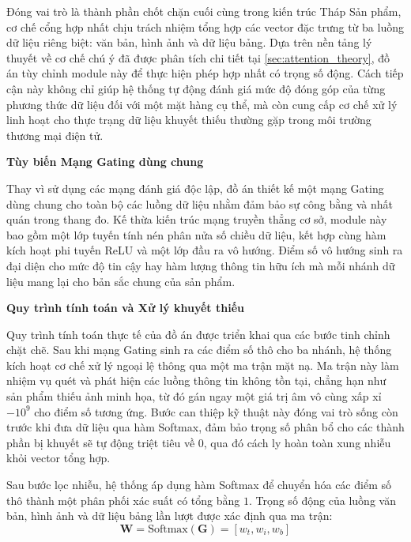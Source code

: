 Đóng vai trò là thành phần chốt chặn cuối cùng trong kiến trúc Tháp Sản phẩm, cơ chế cổng hợp nhất chịu trách nhiệm tổng hợp các vector đặc trưng từ ba luồng dữ liệu riêng biệt: văn bản, hình ảnh và dữ liệu bảng. Dựa trên nền tảng lý thuyết về cơ chế chú ý đã được phân tích chi tiết tại \ref{sec:attention_theory}, đồ án tùy chỉnh module này để thực hiện phép hợp nhất có trọng số động. Cách tiếp cận này không chỉ giúp hệ thống tự động đánh giá mức độ đóng góp của từng phương thức dữ liệu đối với một mặt hàng cụ thể, mà còn cung cấp cơ chế xử lý linh hoạt cho thực trạng dữ liệu khuyết thiếu thường gặp trong môi trường thương mại điện tử.

\vspace{0.3cm}
\noindent \textbf{Tùy biến Mạng Gating dùng chung}

Thay vì sử dụng các mạng đánh giá độc lập, đồ án thiết kế một mạng Gating dùng chung cho toàn bộ các luồng dữ liệu nhằm đảm bảo sự công bằng và nhất quán trong thang đo. Kế thừa kiến trúc mạng truyền thẳng cơ sở, module này bao gồm một lớp tuyến tính nén phân nửa số chiều dữ liệu, kết hợp cùng hàm kích hoạt phi tuyến ReLU và một lớp đầu ra vô hướng. Điểm số vô hướng sinh ra đại diện cho mức độ tin cậy hay hàm lượng thông tin hữu ích mà mỗi nhánh dữ liệu mang lại cho bản sắc chung của sản phẩm.

\vspace{0.3cm}
\noindent \textbf{Quy trình tính toán và Xử lý khuyết thiếu}

Quy trình tính toán thực tế của đồ án được triển khai qua các bước tinh chỉnh chặt chẽ. Sau khi mạng Gating sinh ra các điểm số thô cho ba nhánh, hệ thống kích hoạt cơ chế xử lý ngoại lệ thông qua một ma trận mặt nạ. Ma trận này làm nhiệm vụ quét và phát hiện các luồng thông tin không tồn tại, chẳng hạn như sản phẩm thiếu ảnh minh họa, từ đó gán ngay một giá trị âm vô cùng xấp xỉ $-10^9$ cho điểm số tương ứng. Bước can thiệp kỹ thuật này đóng vai trò sống còn trước khi đưa dữ liệu qua hàm Softmax, đảm bảo trọng số phân bổ cho các thành phần bị khuyết sẽ tự động triệt tiêu về $0$, qua đó cách ly hoàn toàn xung nhiễu khỏi vector tổng hợp.

Sau bước lọc nhiễu, hệ thống áp dụng hàm Softmax để chuyển hóa các điểm số thô thành một phân phối xác suất có tổng bằng $1$. Trọng số động của luồng văn bản, hình ảnh và dữ liệu bảng lần lượt được xác định qua ma trận:
\begin{equation}
    \mathbf{W} = \text{Softmax}(\mathbf{G}) = [w_t, w_i, w_b]
\end{equation}

